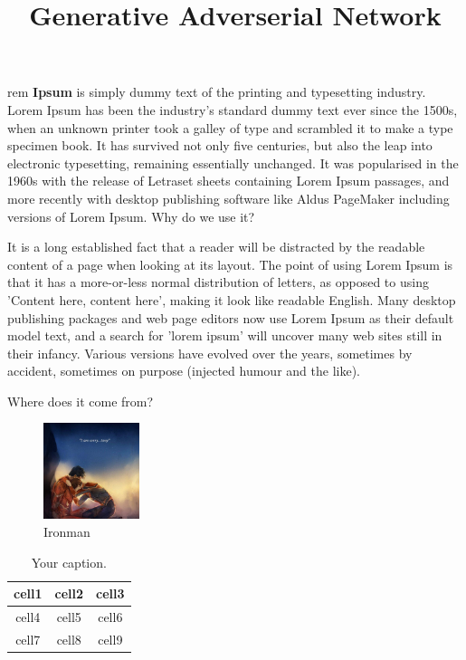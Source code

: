 \documentclass[]{article}
\begin{document}
\title{Generative Adverserial Network}
\maketitle
\tableofcontents
\listoffigures
\listoftables
\twocolumn
rem \textbf{Ipsum} is simply dummy text of the printing and typesetting industry. Lorem Ipsum has been the industry's standard dummy text ever since the 1500s, when an unknown printer took a galley of type and scrambled it to make a type specimen book. It has survived not only five centuries, but also the leap into electronic typesetting, remaining essentially unchanged. It was popularised in the 1960s with the release of Letraset sheets containing Lorem Ipsum passages, and more recently with desktop publishing software like Aldus PageMaker including versions of Lorem Ipsum.
Why do we use it?

It is a long established fact that a reader will be distracted by the readable content of a page when looking at its layout. The point of using Lorem Ipsum is that it has a more-or-less normal distribution of letters, as opposed to using 'Content here, content here', making it look like readable English. Many desktop publishing packages and web page editors now use Lorem Ipsum as their default model text, and a search for 'lorem ipsum' will uncover many web sites still in their infancy. Various versions have evolved over the years, sometimes by accident, sometimes on purpose (injected humour and the like).


Where does it come from?
\begin{figure}
\includegraphics[width=0.25\textwidth]{tonyspidy.jpg}
\caption{Ironman}
\end{figure}


\begin{table}
\begin{tabular}{ c c c } 
 \hline
 cell1 & cell2 & cell3 \\ 
\hline
 cell4 & cell5 & cell6 \\ 
 cell7 & cell8 & cell9 \\ 
 \hline

\end{tabular}
\caption{Your caption.}
\end{table}
\end{document}
